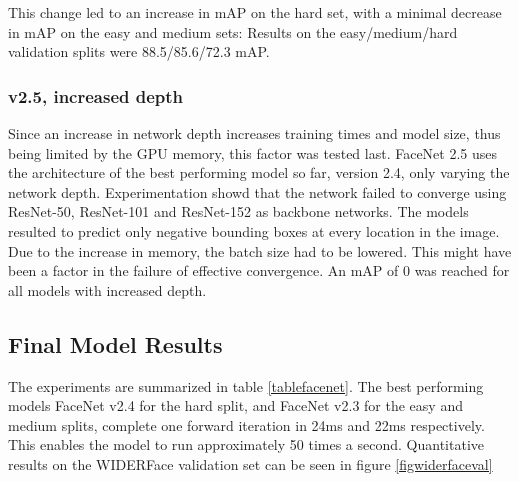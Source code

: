 \documentclass[a4paper, twoside]{article}
\begin{document}
This change led to an increase in mAP on the hard set, with a minimal decrease in mAP on the easy and medium sets: Results on the easy/medium/hard validation splits were 88.5/85.6/72.3 mAP.

\subsubsection{v2.5, increased depth}
Since an increase in network depth increases training times and model size, thus being limited by the GPU memory, this factor was tested last. FaceNet 2.5 uses the architecture of the best performing model so far, version 2.4, only varying the network depth. Experimentation showd that the network failed to converge using ResNet-50, ResNet-101 and ResNet-152 as backbone networks. The models resulted to predict only negative bounding boxes at every location in the image. Due to the increase in memory, the batch size had to be lowered. This might have been a factor in the failure of effective convergence. An mAP of 0 was reached for all models with increased depth.

\subsection{Final Model Results}
The experiments are summarized in table \ref{tablefacenet}. The best performing models FaceNet v2.4 for the hard split, and FaceNet v2.3 for the easy and medium splits, complete one forward iteration in 24ms and 22ms respectively. This enables the model to run approximately 50 times a second. Quantitative results on the WIDERFace validation set can be seen in figure \ref{figwiderfaceval}
\end{document}
